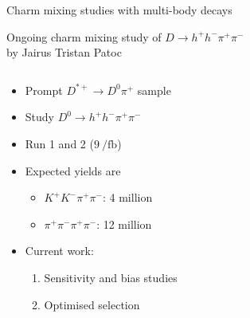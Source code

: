 \documentclass[xcolor={dvipsnames}]{beamer}
\begin{document}
\begin{frame}{Charm mixing studies with multi-body decays}
  \begin{center}
    \Large Ongoing charm mixing study of $D\to h^+h^-\pi^+\pi^-$\\
    \normalsize by Jairus Tristan Patoc
  \end{center}
  \vspace{-0.2cm}
  \begin{columns}
    \begin{column}{0.5\textwidth}
      \vspace{-0.3cm}
      \begin{itemize}
        \setlength\itemsep{1.0em}
        \item{Prompt $D^{*+}\to D^0\pi^+$ sample}
        \item{Study $D^0\to h^+h^-\pi^+\pi^-$}
        \item{Run 1 and 2 ($\SI{9}{\per\femto\barn}$)}
        \item{Expected yields are}
        \begin{itemize}
          \item{$K^+K^-\pi^+\pi^-$: 4 million}
          \item{$\pi^+\pi^-\pi^+\pi^-$: 12 million}
        \end{itemize}
        \item{Current work:}
        \begin{enumerate}
          \item{Sensitivity and bias studies}
          \item{Optimised selection}
        \end{enumerate}
      \end{itemize}
    \end{column}
    \begin{column}{0.5\textwidth}
      \begin{figure}[htb]
        \centering

\end{figure}
\end{column}
\end{columns}
\end{frame}
\end{document}
